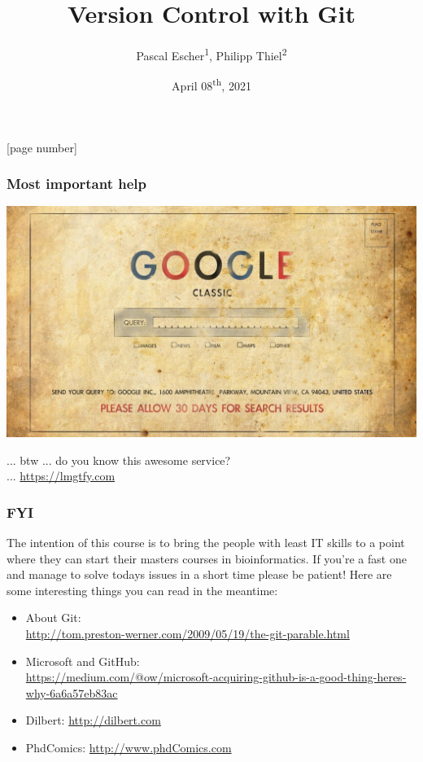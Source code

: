 \documentclass{beamer} %
\begin{document}
\author{Pascal Escher\textsuperscript{1}, Philipp Thiel\textsuperscript{2}}
\title[Git]{Version Control with Git}
\date{April 08\textsuperscript{th}, 2021}
[page number]{}

\maketitle

\begin{frame}
\frametitle{Most important help}
\begin{center}

	\includegraphics[scale=0.18]{assets/google_classic.jpg}

	... btw ...  do you know this awesome service? \\
	... \url{https://lmgtfy.com}

\end{center}
\end{frame}

\begin{frame}
\frametitle{FYI}

The intention of this course is to bring the people with least IT skills to a point where
they can start their masters courses in bioinformatics. If you're a fast one and manage to
solve todays issues in a short time please be patient! Here are some interesting things you
can read in the meantime:

\begin{itemize}
    \setlength\itemsep{1em}
	\item About Git: \\ \url{http://tom.preston-werner.com/2009/05/19/the-git-parable.html}
	\item Microsoft and GitHub: \\ \url{https://medium.com/@ow/microsoft-acquiring-github-is-a-good-thing-heres-why-6a6a57eb83ac}
    \item Dilbert: \url{http://dilbert.com}
    \item PhdComics: \url{http://www.phdComics.com}
\end{itemize}
\end{frame}
\end{document}
